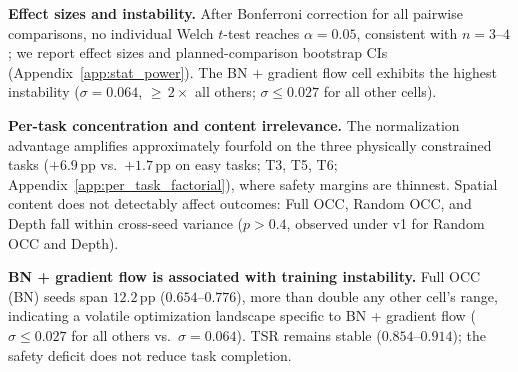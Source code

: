 \textbf{Effect sizes and instability.} After Bonferroni correction for all pairwise comparisons, no individual Welch $t$-test reaches $\alpha{=}0.05$, consistent with $n{=}3$--$4$; we report effect sizes and planned-comparison bootstrap CIs (Appendix~\ref{app:stat_power}). The BN + gradient flow cell exhibits the highest instability ($\sigma{=}0.064$, ${\geq}\,2{\times}$ all others; $\sigma \leq 0.027$ for all other cells).

\textbf{Per-task concentration and content irrelevance.} The normalization advantage amplifies approximately fourfold on the three physically constrained tasks ($+6.9$\,pp vs.\ $+1.7$\,pp on easy tasks; T3, T5, T6; Appendix~\ref{app:per_task_factorial}), where safety margins are thinnest. Spatial content does not detectably affect outcomes: Full OCC, Random OCC, and Depth fall within cross-seed variance ($p > 0.4$, observed under v1 for Random OCC and Depth).

\textbf{BN + gradient flow is associated with training instability.} Full OCC (BN) seeds span $12.2$\,pp ($0.654$--$0.776$), more than double any other cell's range, indicating a volatile optimization landscape specific to BN + gradient flow ($\sigma \leq 0.027$ for all others vs.\ $\sigma{=}0.064$). TSR remains stable ($0.854$--$0.914$); the safety deficit does not reduce task completion.


